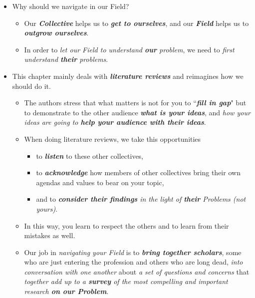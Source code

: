 \documentclass[11pt]{article}
\begin{document}
\begin{enumerate}
\begin{itemize}
\item Why should we navigate in our Field?
\begin{itemize}
\item Our \emph{\textbf{Collective}} helps us to \emph{\textbf{get to ourselves}}, and our \emph{\textbf{Field}} helps us to \emph{\textbf{outgrow ourselves}}.

\item In order to \emph{let our Field to understand \textbf{our} problem}, we need to \emph{first understand \textbf{their} problems}. 
\end{itemize}


\item This chapter mainly deals with \emph{\textbf{literature reviews}} and reimagines how we should do it. 
\begin{itemize}
\item The authors stress that what matters is not for you to ``\emph{\textbf{fill in gap}}" but to demonstrate to the other audience \emph{\textbf{what is your ideas}}, and \emph{how your ideas are going to \textbf{help your audience with their ideas}}.

\item When doing literature reviews, we take this opportunities  
\begin{itemize}
\item to \emph{\textbf{listen}} to these other collectives, 
\item to \emph{\textbf{acknowledge}} how members of other collectives bring their own agendas and values to bear on your topic,
\item and to \emph{\textbf{consider their findings} in the light of \textbf{their} Problems (not yours)}.
\end{itemize}

\item In this way, you learn to respect the others and to learn from their mistakes as well.

\item Our job in \emph{navigating your Field} is to \emph{\textbf{bring together scholars}}, some who are just entering the profession and others who are long dead, \emph{into conversation with one another} about \emph{a set of questions and concerns} that \emph{together add up to a \textbf{survey} of the most compelling and important research \textbf{on our Problem}}.
\end{itemize}


\end{itemize}
\end{enumerate}
\end{document}
